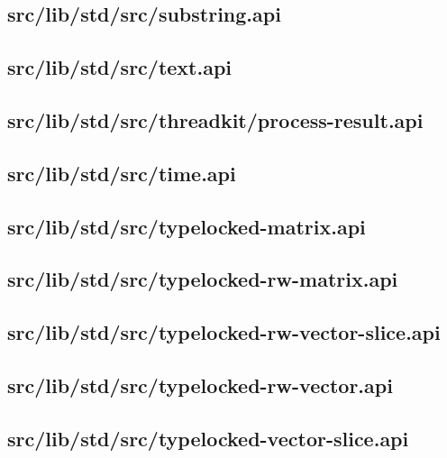 \subsection{src/lib/std/src/substring.api}


\subsection{src/lib/std/src/text.api}


\subsection{src/lib/std/src/threadkit/process-result.api}


\subsection{src/lib/std/src/time.api}


\subsection{src/lib/std/src/typelocked-matrix.api}


\subsection{src/lib/std/src/typelocked-rw-matrix.api}


\subsection{src/lib/std/src/typelocked-rw-vector-slice.api}


\subsection{src/lib/std/src/typelocked-rw-vector.api}


\subsection{src/lib/std/src/typelocked-vector-slice.api}



